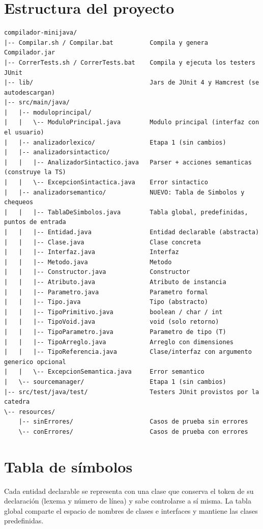 \documentclass[11pt,a4paper]{article}
\begin{document}
\section{Estructura del proyecto}

{\footnotesize
\begin{verbatim}
compilador-minijava/
|-- Compilar.sh / Compilar.bat          Compila y genera Compilador.jar
|-- CorrerTests.sh / CorrerTests.bat    Compila y ejecuta los testers JUnit
|-- lib/                                Jars de JUnit 4 y Hamcrest (se autodescargan)
|-- src/main/java/
|   |-- moduloprincipal/
|   |   \-- ModuloPrincipal.java        Modulo principal (interfaz con el usuario)
|   |-- analizadorlexico/               Etapa 1 (sin cambios)
|   |-- analizadorsintactico/
|   |   |-- AnalizadorSintactico.java   Parser + acciones semanticas (construye la TS)
|   |   \-- ExcepcionSintactica.java    Error sintactico
|   |-- analizadorsemantico/            NUEVO: Tabla de Simbolos y chequeos
|   |   |-- TablaDeSimbolos.java        Tabla global, predefinidas, puntos de entrada
|   |   |-- Entidad.java                Entidad declarable (abstracta)
|   |   |-- Clase.java                  Clase concreta
|   |   |-- Interfaz.java               Interfaz
|   |   |-- Metodo.java                 Metodo
|   |   |-- Constructor.java            Constructor
|   |   |-- Atributo.java               Atributo de instancia
|   |   |-- Parametro.java              Parametro formal
|   |   |-- Tipo.java                   Tipo (abstracto)
|   |   |-- TipoPrimitivo.java          boolean / char / int
|   |   |-- TipoVoid.java               void (solo retorno)
|   |   |-- TipoParametro.java          Parametro de tipo (T)
|   |   |-- TipoArreglo.java            Arreglo con dimensiones
|   |   |-- TipoReferencia.java         Clase/interfaz con argumento generico opcional
|   |   \-- ExcepcionSemantica.java     Error semantico
|   \-- sourcemanager/                  Etapa 1 (sin cambios)
|-- src/test/java/test/                 Testers JUnit provistos por la catedra
\-- resources/
    |-- sinErrores/                     Casos de prueba sin errores
    \-- conErrores/                     Casos de prueba con errores
\end{verbatim}
}

\section{Tabla de símbolos}

Cada entidad declarable se representa con una clase que conserva el token de su
declaración (lexema y número de línea) y sabe controlarse a sí misma. La tabla
global comparte el espacio de nombres de clases e interfaces y mantiene las clases
predefinidas.
\end{document}

